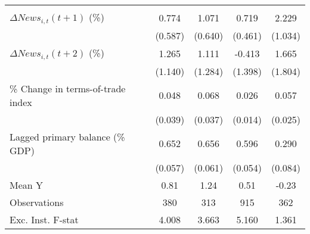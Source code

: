 {\begin{tabular}{l*{4}{c}}
                    &                     &                     &                     &                     \\
\addlinespace
$ \Delta News_{i,t}(t+1)$ (\%)&       0.774         &       1.071\sym{*}  &       0.719         &       2.229\sym{**} \\
                    &     (0.587)         &     (0.640)         &     (0.461)         &     (1.034)         \\
\addlinespace
$ \Delta News_{i,t}(t+2)$ (\%)&       1.265         &       1.111         &      -0.413         &       1.665         \\
                    &     (1.140)         &     (1.284)         &     (1.398)         &     (1.804)         \\
\addlinespace
\% Change in terms-of-trade index&       0.048         &       0.068\sym{*}  &       0.026\sym{*}  &       0.057\sym{**} \\
                    &     (0.039)         &     (0.037)         &     (0.014)         &     (0.025)         \\
\addlinespace
Lagged primary balance (\% GDP)&       0.652\sym{***}&       0.656\sym{***}&       0.596\sym{***}&       0.290\sym{***}\\
                    &     (0.057)         &     (0.061)         &     (0.054)         &     (0.084)         \\
\midrule
Mean Y              &        0.81         &        1.24         &        0.51         &       -0.23         \\
Observations        &         380         &         313         &         915         &         362         \\
Exc. Inst. F-stat   &       4.008         &       3.663         &       5.160         &       1.361         \\
\bottomrule
\end{tabular}
}
